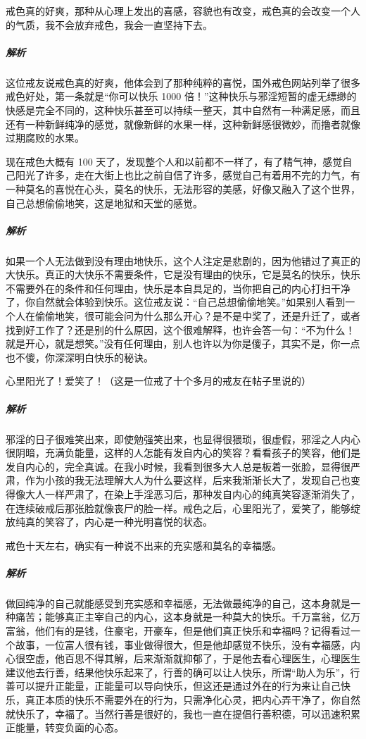 \begin{case}[你可以快乐 1000 倍！]
    戒色真的好爽，那种从心理上发出的喜感，容貌也有改变，戒色真的会改变一个人的气质，我不会放弃戒色，我会一直坚持下去。
    \subparagraph{解析} 这位戒友说戒色真的好爽，他体会到了那种纯粹的喜悦，国外戒色网站列举了很多戒色好处，第一条就是“你可以快乐 1000 倍！”这种快乐与邪淫短暂的虚无缥缈的快感是完全不同的，这种快乐甚至可以持续一整天，其中自然有一种满足感，而且还有一种新鲜纯净的感觉，就像新鲜的水果一样，这种新鲜感很微妙，而撸者就像过期腐败的水果。
\end{case}

\begin{case}[没有理由地快乐]
    现在戒色大概有 100 天了，发现整个人和以前都不一样了，有了精气神，感觉自己阳光了许多，走在大街上也比之前自信了许多，感觉自己有着用不完的力气，有一种莫名的喜悦在心头，莫名的快乐，无法形容的美感，好像又融入了这个世界，自己总想偷偷地笑，这是地狱和天堂的感觉。
    \subparagraph{解析} 如果一个人无法做到没有理由地快乐，这个人注定是悲剧的，因为他错过了真正的大快乐。真正的大快乐不需要条件，它是没有理由的快乐，它是莫名的快乐，快乐不需要外在的条件和任何理由，快乐是本自具足的，当你把自己的内心打扫干净了，你自然就会体验到快乐。这位戒友说：“自己总想偷偷地笑。”如果别人看到一个人在偷偷地笑，很可能会问为什么那么开心？是不是中奖了，还是升迁了，或者找到好工作了？还是别的什么原因，这个很难解释，也许会答一句：“不为什么！就是开心，就是想笑。”没有任何理由，别人也许以为你是傻子，其实不是，你一点也不傻，你深深明白快乐的秘诀。
\end{case}

\begin{case}[戒色之后爱笑了]
    心里阳光了！爱笑了！（这是一位戒了十个多月的戒友在帖子里说的）
    \subparagraph{解析} 邪淫的日子很难笑出来，即使勉强笑出来，也显得很猥琐，很虚假，邪淫之人内心很阴暗，充满负能量，这样的人怎能有发自内心的笑容？看看孩子的笑容，他们是发自内心的，完全真诚。在我小时候，我看到很多大人总是板着一张脸，显得很严肃，作为小孩的我无法理解大人为什么要这样，后来我渐渐长大了，发现自己也变得像大人一样严肃了，在染上手淫恶习后，那种发自内心的纯真笑容逐渐消失了，在连续破戒后那张脸就像丧尸的脸一样。戒色之后，心里阳光了，爱笑了，能够绽放纯真的笑容了，内心是一种光明喜悦的状态。
\end{case}

\begin{case}[充实感和幸福感]
    戒色十天左右，确实有一种说不出来的充实感和莫名的幸福感。
    \subparagraph{解析} 做回纯净的自己就能感受到充实感和幸福感，无法做最纯净的自己，这本身就是一种痛苦；能够真正主宰自己的内心，这本身就是一种莫大的快乐。千万富翁，亿万富翁，他们有的是钱，住豪宅，开豪车，但是他们真正快乐和幸福吗？记得看过一个故事，一位富人很有钱，事业做得很大，但是他却感觉不快乐，没有幸福感，内心很空虚，他百思不得其解，后来渐渐就抑郁了，于是他去看心理医生，心理医生建议他去行善，结果他快乐起来了，行善的确可以让人快乐，所谓“助人为乐”，行善可以提升正能量，正能量可以导向快乐，但这还是通过外在的行为来让自己快乐，真正本质的快乐不需要外在的行为，只需净化心灵，把内心弄干净了，你自然就快乐了，幸福了。当然行善是很好的，我也一直在提倡行善积德，可以迅速积累正能量，转变负面的心态。
\end{case}

